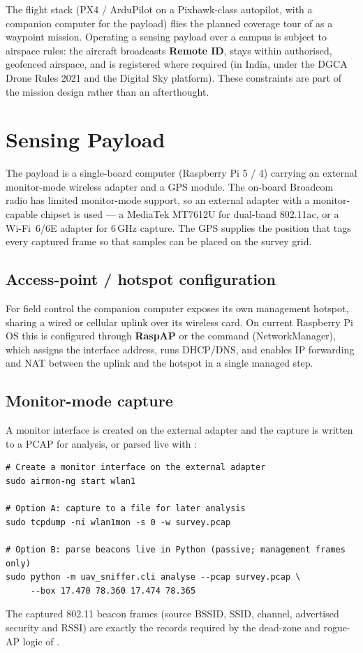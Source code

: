 The flight stack (PX4 / ArduPilot on a Pixhawk-class autopilot, with a companion
computer for the payload) flies the planned coverage tour of  as a
waypoint mission. Operating a sensing payload over a campus is subject to
airspace rules: the aircraft broadcasts \textbf{Remote ID}, stays within
authorised, geofenced airspace, and is registered where required (in India, under
the DGCA Drone Rules 2021 and the Digital Sky platform). These constraints are
part of the mission design rather than an afterthought.

\section{Sensing Payload}
The payload is a single-board computer (Raspberry Pi 5 / 4) carrying an external
monitor-mode wireless adapter and a GPS module. The on-board Broadcom radio has
limited monitor-mode support, so an external adapter with a monitor-capable
chipset is used --- a MediaTek MT7612U for dual-band 802.11ac, or a Wi-Fi~6/6E
adapter for 6\,GHz capture. The GPS supplies the position that tags every captured
frame so that samples can be placed on the survey grid.

\subsection{Access-point / hotspot configuration}
For field control the companion computer exposes its own management hotspot,
sharing a wired or cellular uplink over its wireless card. On current Raspberry Pi
OS this is configured through \textbf{RaspAP} or the  command (NetworkManager), which assigns the interface address, runs
DHCP/DNS, and enables IP forwarding and NAT between the uplink and the hotspot in
a single managed step.

\subsection{Monitor-mode capture}
A monitor interface is created on the external adapter and the capture is written
to a PCAP for analysis, or parsed live with :
\begin{lstlisting}[style=shell]
# Create a monitor interface on the external adapter
sudo airmon-ng start wlan1

# Option A: capture to a file for later analysis
sudo tcpdump -ni wlan1mon -s 0 -w survey.pcap

# Option B: parse beacons live in Python (passive; management frames only)
sudo python -m uav_sniffer.cli analyse --pcap survey.pcap \
     --box 17.470 78.360 17.474 78.365
\end{lstlisting}
The captured 802.11 beacon frames (source BSSID, SSID, channel, advertised
security and RSSI) are exactly the records required by the dead-zone and rogue-AP
logic of \Cref{ch:dead,ch:rogue}.

